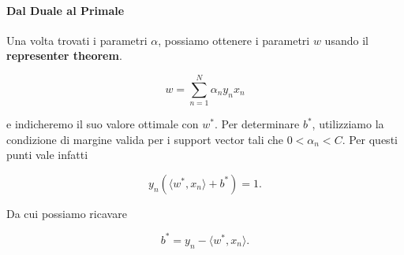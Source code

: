 \paragraph{Dal Duale al Primale} Una volta trovati i parametri $\alpha$, possiamo ottenere i parametri $w$ usando il \textbf{representer theorem}.

$$
w = \sum_{n=1}^{N} \alpha_n y_n x_n
$$

e indicheremo il suo valore ottimale con $w^*$. 
Per determinare $b^*$, utilizziamo la condizione di margine
valida per i support vector tali che $0 < \alpha_n < C$.
Per questi punti vale infatti

\[
y_n(\langle w^*, x_n\rangle + b^*) = 1.
\]

Da cui possiamo ricavare

\[
b^* = y_n - \langle w^*, x_n\rangle.
\]